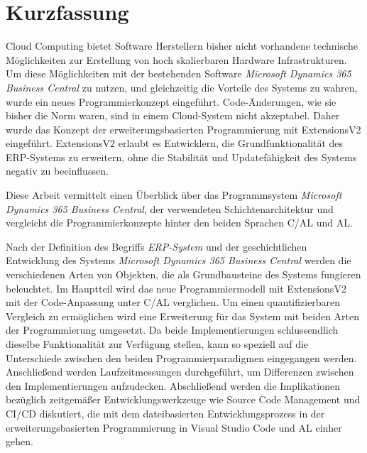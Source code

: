 \chapter{Kurzfassung}
\label{cha:Kurzfassung}
Cloud Computing bietet Software Herstellern bisher nicht vorhandene technische Möglichkeiten zur Erstellung von hoch skalierbaren Hardware Infrastrukturen. Um diese Möglichkeiten mit der bestehenden Software \textit{Microsoft Dynamics 365 Business Central} zu nutzen, und gleichzeitig die Vorteile des Systems zu wahren, wurde ein neues Programmierkonzept eingeführt. Code-Änderungen, wie sie bisher die Norm waren, sind in einem Cloud-System nicht akzeptabel. Daher wurde das Konzept der erweiterungsbasierten Programmierung mit ExtensionsV2 eingeführt. ExtensionsV2 erlaubt es Entwicklern, die Grundfunktionalität des ERP-Systems zu erweitern, ohne die Stabilität und Updatefähigkeit des Systems negativ zu beeinflussen.


Diese Arbeit vermittelt einen Überblick über das Programmsystem \textit{Microsoft Dynamics 365 Business Central}, der verwendeten Schichtenarchitektur und vergleicht die Programmierkonzepte hinter den beiden Sprachen C/AL und AL.


Nach der Definition des Begriffs \textit{ERP-System} und der geschichtlichen Entwicklung des Systems \textit{Microsoft Dynamics 365 Business Central} werden die verschiedenen Arten von Objekten, die als Grundbausteine des Systems fungieren beleuchtet. Im Hauptteil wird das neue Programmiermodell mit ExtensionsV2 mit der Code-Anpassung unter C/AL verglichen.  Um einen quantifizierbaren Vergleich zu ermöglichen wird eine Erweiterung für das System mit beiden Arten der Programmierung umgesetzt. Da beide Implementierungen schlussendlich dieselbe Funktionalität zur Verfügung stellen, kann so speziell auf die Unterschiede zwischen den beiden Programmierparadigmen eingegangen werden. Anschließend werden Laufzeitmessungen durchgeführt, um Differenzen zwischen den Implementierungen aufzudecken. Abschließend werden die Implikationen bezüglich zeitgemäßer Entwicklungswerkzeuge wie Source Code Management und CI/CD diskutiert, die mit dem dateibasierten Entwicklungsprozess in der erweiterungsbasierten Programmierung in Visual Studio Code und AL einher gehen.